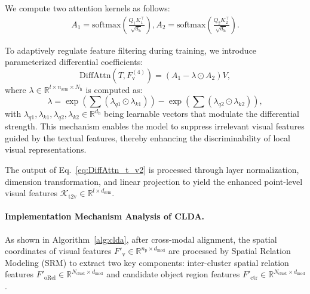 \documentclass[letterpaper]{article} %
\begin{document}
We compute two attention kernels as follows:
\begin{equation*}
	\begin{aligned}
		A_1=\text{softmax}\left(\frac{Q_1 K_1^\intercal}{\sqrt{d_\mathrm{h}}}\right), 
		A_2=\text{softmax}\left(\frac{Q_2 K_2^\intercal}{\sqrt{d_\mathrm{h}}}\right).
	\end{aligned}
\end{equation*}

To adaptively regulate feature filtering during training, we introduce parameterized differential coefficients:
\begin{equation}
	\text{DiffAttn}(T, F_{\text{v}}^{(4)}) = (A_1 - \lambda \odot A_2)V,
	\label{eq:DiffAttn_t_v2}
\end{equation}
where $\lambda \in \mathbb{R}^{l \times n_\mathrm{sem} \times N_\mathrm{h}}$ is computed as:
\begin{equation*}
	\lambda = \exp\left(\sum (\lambda_{q1} \odot \lambda_{k1})\right) - \exp\left(\sum (\lambda_{q2} \odot \lambda_{k2})\right),
\end{equation*}
with $\lambda_{q1}, \lambda_{k1}, \lambda_{q2}, \lambda_{k2} \in \mathbb{R}^{d_\mathrm{h}}$ being learnable vectors that modulate the differential strength. 
This mechanism enables the model to suppress irrelevant visual features guided by the textual features, thereby enhancing the discriminability of local visual representations.

The output of Eq.~\eqref{eq:DiffAttn_t_v2} is processed through layer normalization, dimension transformation, and linear projection to yield the enhanced point-level visual features $\mathcal{K}_\mathrm{t2v} \in \mathbb{R}^{l \times d_\mathrm{sem}}$.


\paragraph{Implementation Mechanism Analysis of CLDA.}
As shown in Algorithm~\ref{alg:clda}, after cross-modal alignment, the spatial coordinates of visual features $F'_{\mathrm{v}} \in \mathbb{R}^{n_\mathrm{p} \times d_\mathrm{mod}}$ are processed by Spatial Relation Modeling (SRM) to extract two key components: inter-cluster spatial relation features $F'_{\mathrm{oRel}} \in \mathbb{R}^{N_{\mathrm{clust}} \times d_{\mathrm{mod}}}$ and candidate object region features $F'_{\mathrm{ctr}} \in \mathbb{R}^{N_{\mathrm{clust}} \times d_{\mathrm{mod}}}$.
\end{document}
